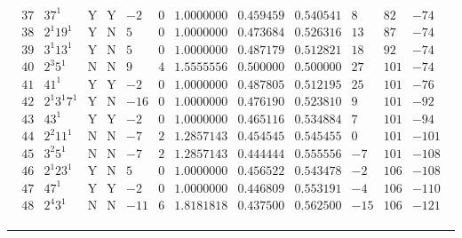 \documentclass[11pt,reqno,a4letter]{article}
\numberwithin{figure}{section}
\numberwithin{table}{section}
\theoremstyle{plain}
\numberwithin{theorem}{section}
\theoremstyle{definition}
\begin{document}
\begin{table}[ht!]
\begin{equation*}
{\begin{array}{cc|cc|ccc|cc|ccc}
 37 & 37^1 & \text{Y} & \text{Y} & -2 & 0 & 1.0000000 & 0.459459 & 0.540541 & 8 & 82 & -74 \\
 38 & 2^1 19^1 & \text{Y} & \text{N} & 5 & 0 & 1.0000000 & 0.473684 & 0.526316 & 13 & 87 & -74 \\
 39 & 3^1 13^1 & \text{Y} & \text{N} & 5 & 0 & 1.0000000 & 0.487179 & 0.512821 & 18 & 92 & -74 \\
 40 & 2^3 5^1 & \text{N} & \text{N} & 9 & 4 & 1.5555556 & 0.500000 & 0.500000 & 27 & 101 & -74 \\
 41 & 41^1 & \text{Y} & \text{Y} & -2 & 0 & 1.0000000 & 0.487805 & 0.512195 & 25 & 101 & -76 \\
 42 & 2^1 3^1 7^1 & \text{Y} & \text{N} & -16 & 0 & 1.0000000 & 0.476190 & 0.523810 & 9 & 101 & -92 \\
 43 & 43^1 & \text{Y} & \text{Y} & -2 & 0 & 1.0000000 & 0.465116 & 0.534884 & 7 & 101 & -94 \\
 44 & 2^2 11^1 & \text{N} & \text{N} & -7 & 2 & 1.2857143 & 0.454545 & 0.545455 & 0 & 101 & -101 \\
 45 & 3^2 5^1 & \text{N} & \text{N} & -7 & 2 & 1.2857143 & 0.444444 & 0.555556 & -7 & 101 & -108 \\
 46 & 2^1 23^1 & \text{Y} & \text{N} & 5 & 0 & 1.0000000 & 0.456522 & 0.543478 & -2 & 106 & -108 \\
 47 & 47^1 & \text{Y} & \text{Y} & -2 & 0 & 1.0000000 & 0.446809 & 0.553191 & -4 & 106 & -110 \\
 48 & 2^4 3^1 & \text{N} & \text{N} & -11 & 6 & 1.8181818 & 0.437500 & 0.562500 & -15 & 106 & -121 \\ 
\end{array}
}
\end{equation*}

\bigskip\hrule\smallskip 


\end{table}
\end{document}
